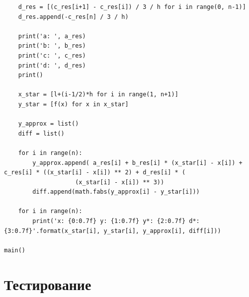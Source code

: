 \documentclass[14pt, russian]{scrartcl}
\begin{document}
\begin{verbatim}
    d_res = [(c_res[i+1] - c_res[i]) / 3 / h for i in range(0, n-1)]
    d_res.append(-c_res[n] / 3 / h)

    print('a: ', a_res)
    print('b: ', b_res)
    print('c: ', c_res)
    print('d: ', d_res)
    print()

    x_star = [l+(i-1/2)*h for i in range(1, n+1)]
    y_star = [f(x) for x in x_star]

    y_approx = list()
    diff = list()

    for i in range(n):
        y_approx.append( a_res[i] + b_res[i] * (x_star[i] - x[i]) + c_res[i] * ((x_star[i] - x[i]) ** 2) + d_res[i] * (
                    (x_star[i] - x[i]) ** 3))
        diff.append(math.fabs(y_approx[i] - y_star[i]))

    for i in range(n):
        print('x: {0:0.7f} y: {1:0.7f} y*: {2:0.7f} d*: {3:0.7f}'.format(x_star[i], y_star[i], y_approx[i], diff[i]))

main()
  \end{verbatim}


\section{Тестирование}
\end{document}
